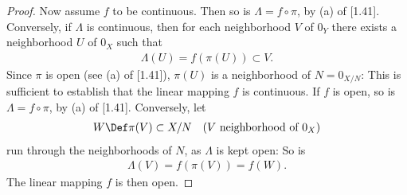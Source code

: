 \begin{proof}
Now assume $f$ to be continuous. Then so is 
%
  $\Lambda = f\circ \pi $, 
% 
by (a) of [1.41]. 
%
Conversely, 
%
if $\Lambda$ is continuous, then for each neighborhood $V$ of $0_Y$ 
there exists a neighborhood $U$ of $0_X$ such that
%
  \begin{align}
    \Lambda(U) = f\left(\pi(U)\right) 
      \subset 
    V.
  \end{align}
%
Since $\pi$ is open (see (a) of [1.41]), $\pi(U)$ is a neighborhood of 
%
  $N=0_{X/N}$: 
This is sufficient to establish that the linear mapping $f$ is continuous.
%
If $f$ is open, so is $\Lambda = f\circ \pi$, by (a) of [1.41]. 
%
Conversely, let  
%
  \begin{align}
    W \Def \pi (V) \subset  X/N \quad (V \text{ neighborhood of } 0_X) 
  \end{align}
%
run through the neighborhoods of $N$, as $\Lambda$ is kept open: So is 
%
  \begin{align}
    \Lambda(V) = f \left(\pi(V)\right) = f(W).  
  \end{align}
%
The linear mapping $f$ is then open. 
\end{proof}


